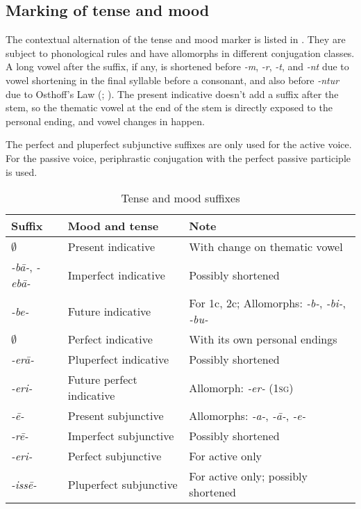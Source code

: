 \documentclass[a4paper, oneside]{report}
\newcommand*{\citepage}[1]{p.~{#1}}
\newcommand{\form}[1]{\emph{#1}}
\newcommand*{\category}[1]{\textsc{#1}}
\begin{document}
\subsection{Marking of tense and mood}\label{sec:tense-mood-marking}

The contextual alternation of the tense and mood marker is listed in
.
They are subject to phonological rules 
and have allomorphs in different conjugation classes. 
A long vowel after the suffix,
if any, is shortened before \form{-m}, \form{-r}, \form{-t}, and \form{-nt}
due to vowel shortening in the final syllable before a consonant,
and also before \form{-ntur} due to Osthoff's Law 
(; 
\citealt[\citepage{130}]{oniga2014latin}).
The present indicative doesn't add a suffix after the stem, 
so the thematic vowel at the end of the stem 
is directly exposed to the personal ending,
and vowel changes in  happen.

The perfect and pluperfect subjunctive suffixes 
are only used for the active voice.
For the passive voice,
periphrastic conjugation with the perfect passive participle is used.

\begin{table}[H]
    \caption{Tense and mood suffixes}
    \label{tbl:tense-suffix}
    \centering
    \begin{tabular}{lll}
        \toprule
        Suffix & Mood and tense & Note \\
        \midrule
        $\emptyset$         & Present indicative        & With change on thematic vowel\\
        \form{-b\={a}-}, \form{-eb\={a}-}    & Imperfect indicative      & Possibly shortened \\
        \form{-be-}         & Future indicative         & For 1c, 2c; 
        Allomorphs: \form{-b-}, \form{-bi-}, \form{-bu-} \\
        \midrule
        $\emptyset$         & Perfect indicative        & With its own personal endings \\ 
        \form{-er\={a}-}    & Pluperfect indicative     & Possibly shortened \\
        \form{-eri-}        & Future perfect indicative & Allomorph: \form{-er-} (\category{1sg}) \\ 
        \midrule
        \form{-\={e}-}      & Present subjunctive       & Allomorphs: \form{-a-}, \form{-\={a}-},
        \form{-e-} \\ 
        \form{-r\={e}-}     & Imperfect subjunctive     & Possibly shortened \\
        \midrule
        \form{-eri-}        & Perfect subjunctive       & For active only \\
        \form{-iss\={e}-}   & Pluperfect subjunctive    & For active only; possibly shortened  \\ \bottomrule
        \end{tabular}
\end{table}
\end{document}
